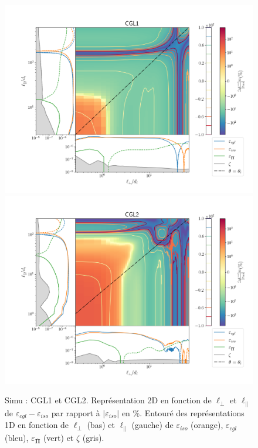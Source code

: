 \begin{figure}[!ht]
 \centering
 \includegraphics[width=0.95\linewidth,trim=1cm 1cm 0cm 2cm, clip=true]{./Part_3/images_ch3/CGL1_panel_isocgl_percent}
\includegraphics[width=0.95\linewidth,trim=1cm 1cm 0cm 2cm, clip=true]{./Part_3/images_ch3/CGL2_panel_isocgl_percent}
\cprotect\caption{Simu : CGL1 et CGL2. Représentation 2D en fonction de $\ell_{\perp}$ et $\ell_{\parallel}$ de $\varepsilon_{cgl}-\varepsilon_{iso}$ par rapport à $|\varepsilon_{iso}|$ en $\%$. Entouré des représentations 1D en fonction de $\ell_{\perp}$ (bas) et $\ell_{\parallel}$ (gauche) de $\varepsilon_{iso}$ (orange), $\varepsilon_{cgl}$ (bleu), $\varepsilon_{\overline{\boldsymbol{\Pi}}} $ (vert) et $\zeta$ (gris). }
\label{fig:trip_CGL1-2}
\end{figure}
